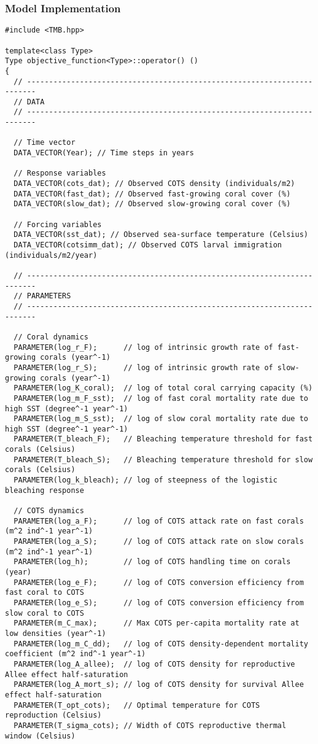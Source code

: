 \subsubsection{Model Implementation}
\begin{lstlisting}
#include <TMB.hpp>

template<class Type>
Type objective_function<Type>::operator() ()
{
  // ------------------------------------------------------------------------
  // DATA
  // ------------------------------------------------------------------------
  
  // Time vector
  DATA_VECTOR(Year); // Time steps in years

  // Response variables
  DATA_VECTOR(cots_dat); // Observed COTS density (individuals/m2)
  DATA_VECTOR(fast_dat); // Observed fast-growing coral cover (%)
  DATA_VECTOR(slow_dat); // Observed slow-growing coral cover (%)

  // Forcing variables
  DATA_VECTOR(sst_dat); // Observed sea-surface temperature (Celsius)
  DATA_VECTOR(cotsimm_dat); // Observed COTS larval immigration (individuals/m2/year)

  // ------------------------------------------------------------------------
  // PARAMETERS
  // ------------------------------------------------------------------------

  // Coral dynamics
  PARAMETER(log_r_F);      // log of intrinsic growth rate of fast-growing corals (year^-1)
  PARAMETER(log_r_S);      // log of intrinsic growth rate of slow-growing corals (year^-1)
  PARAMETER(log_K_coral);  // log of total coral carrying capacity (%)
  PARAMETER(log_m_F_sst);  // log of fast coral mortality rate due to high SST (degree^-1 year^-1)
  PARAMETER(log_m_S_sst);  // log of slow coral mortality rate due to high SST (degree^-1 year^-1)
  PARAMETER(T_bleach_F);   // Bleaching temperature threshold for fast corals (Celsius)
  PARAMETER(T_bleach_S);   // Bleaching temperature threshold for slow corals (Celsius)
  PARAMETER(log_k_bleach); // log of steepness of the logistic bleaching response

  // COTS dynamics
  PARAMETER(log_a_F);      // log of COTS attack rate on fast corals (m^2 ind^-1 year^-1)
  PARAMETER(log_a_S);      // log of COTS attack rate on slow corals (m^2 ind^-1 year^-1)
  PARAMETER(log_h);        // log of COTS handling time on corals (year)
  PARAMETER(log_e_F);      // log of COTS conversion efficiency from fast coral to COTS
  PARAMETER(log_e_S);      // log of COTS conversion efficiency from slow coral to COTS
  PARAMETER(m_C_max);      // Max COTS per-capita mortality rate at low densities (year^-1)
  PARAMETER(log_m_C_dd);   // log of COTS density-dependent mortality coefficient (m^2 ind^-1 year^-1)
  PARAMETER(log_A_allee);  // log of COTS density for reproductive Allee effect half-saturation
  PARAMETER(log_A_mort_s); // log of COTS density for survival Allee effect half-saturation
  PARAMETER(T_opt_cots);   // Optimal temperature for COTS reproduction (Celsius)
  PARAMETER(T_sigma_cots); // Width of COTS reproductive thermal window (Celsius)


\end{lstlisting}
